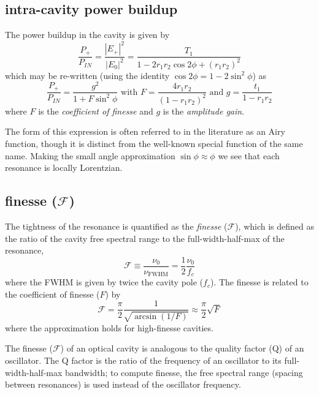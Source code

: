 \subsection{intra-cavity power buildup}

The power buildup in the cavity is given by 
\begin{equation}
\frac{P_+}{P_{IN}} = \frac{|E_+|^2}{|E_0|^2} = \frac{ T_1}{1 - 2 r_1 r_2 \cos 2\phi+\left(r_1 r_2\right)^2 }
\end{equation} 
which may be re-written (using the identity $\cos2\phi = 1 -
2\sin^2\phi$) as
\begin{equation}
\label{cavity_buildup_eq}
\frac{P_+}{P_{IN}} = \frac{g^2}{1 + F \sin^2 \phi} 
\text{  with  } F = \frac{4 r_1 r_2}{(1 - r_1 r_2)^2}
\text{  and  } g = \frac{t_1}{1-r_1 r_2}
\end{equation} 
where $F$ is the \emph{coefficient of finesse} and $g$ is the
\emph{amplitude gain}.

The form of this expression is often referred to in the literature as
an Airy function, though it is distinct from the well-known special
function of the same name.  Making the small angle approximation
$\sin\phi\approx\phi$ we see that each resonance is locally Lorentzian.

\subsection{finesse ($\mathcal{F}$)}
The tightness of the resonance is quantified as the
\emph{finesse} ($\mathcal{F}$), which is defined as the ratio of the
cavity free spectral range to the full-width-half-max of the
resonance,
\begin{equation}
\mathcal{F} \equiv \frac{\nu_0}{\nu_{\mathrm{FWHM}}}
= \frac{1}{2}\frac{\nu_0}{f_c}
\end{equation}
%
where the FWHM is given by twice the cavity pole ($f_c$).  The finesse is related to the coefficient of finesse ($F$) by
%
\begin{equation}
\mathcal{F} = \frac{\pi}{2} \frac{1}{{\sqrt{\arcsin (1/F)}}} \approx \frac{\pi}{2}\sqrt{F}
\end{equation}where the approximation holds for high-finesse cavities.

The finesse ($\mathcal{F}$) of an optical cavity is analogous to
the quality factor (Q) of an oscillator. The Q factor is the ratio
of the frequency of an oscillator to its full-width-half-max bandwidth;
to compute finesse, the free spectral range (spacing between resonances)
is used instead of the oscillator frequency.

